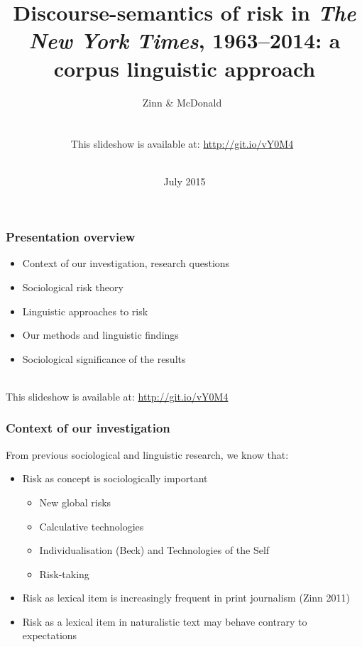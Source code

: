 \documentclass{beamer}       %
\title[ISFC Aachen 2015]{Discourse-semantics of risk in \emph{The New York Times}, 1963--2014: a corpus linguistic approach}
\author[Jens Zinn \and Daniel McDonald]{Zinn \& McDonald~\\~\\~\\This slideshow is available at: \url{http://git.io/vY0M4}~\\~\\}
\date{July 2015}
\begin{document}

\frame{\titlepage}


\begin{frame}
    \frametitle{Presentation overview}
    
    \begin{itemize}
    \item Context of our investigation, research questions
    \item Sociological risk theory
    \item Linguistic approaches to risk
    \item Our methods and linguistic findings
    \item Sociological significance of the results
    \end{itemize}

    ~\\ This slideshow is available at: \url{http://git.io/vY0M4}

\end{frame}


\begin{frame}
    \frametitle{Context of our investigation}
    
    From previous sociological and linguistic research, we know that:

    \begin{itemize}
    \item Risk as concept is sociologically important
    \begin{itemize}
        \item New global risks \cite{beck_risk_1992}
        \item Calculative technologies \cite{dean_risk_1998,dean_governmentality:_2010}
        \item Individualisation (Beck) and Technologies of the Self \cite{foucault_technologies_1988}
        \item Risk-taking \cite{luhmann_risk:_1993}
    \end{itemize}
    \item Risk as lexical item is increasingly frequent in print journalism (Zinn 2011)
    \item Risk as a lexical item in naturalistic text may behave contrary to expectations \cite{hamilton_meanings_2007}
    \end{itemize}
\end{frame}
\end{document}
